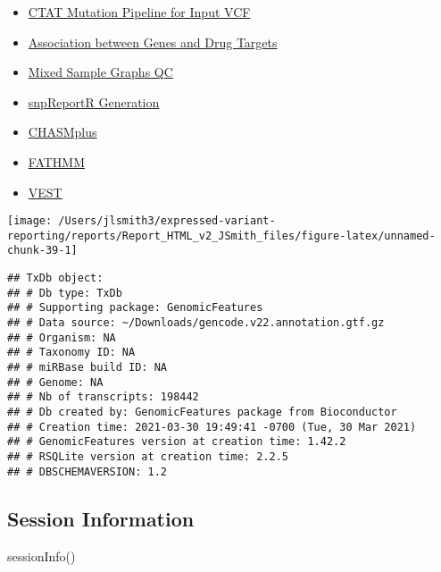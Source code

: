 \documentclass[
]{article}
\newenvironment{Shaded}{\begin{snugshade}}{\end{snugshade}}
\newcommand{\FunctionTok}[1]{\textcolor[rgb]{0.56,0.27,0.68}{#1}}
\newcommand{\NormalTok}[1]{\textcolor[rgb]{0.81,0.81,0.76}{#1}}
\providecommand{\tightlist}{%
  \setlength{\itemsep}{0pt}\setlength{\parskip}{0pt}}
\begin{document}
\begin{itemize}
\tightlist
\item
  \href{https://github.com/collaborativebioinformatics/expressed-variant-impact}{CTAT
  Mutation Pipeline for Input VCF}
\item
  \href{https://github.com/collaborativebioinformatics/viravate2}{Association
  between Genes and Drug Targets}
\item
  \href{https://github.com/collaborativebioinformatics/mixed-sample-graphs}{Mixed
  Sample Graphs QC}
\item
  \href{https://github.com/collaborativebioinformatics/expressed-variant-reporting}{snpReportR
  Generation}
\item
  \href{https://chasmplus.readthedocs.io/en/latest/index.html}{CHASMplus}
\item
  \href{http://fathmm.biocompute.org.uk/}{FATHMM}
\item
  \href{https://karchinlab.org/apps/appVest.html}{VEST}
\end{itemize}

\begin{center}\texttt{[image: /Users/jlsmith3/expressed-variant-reporting/reports/Report\_HTML\_v2\_JSmith\_files/figure-latex/unnamed-chunk-39-1]} \end{center}

\begin{verbatim}
## TxDb object:
## # Db type: TxDb
## # Supporting package: GenomicFeatures
## # Data source: ~/Downloads/gencode.v22.annotation.gtf.gz
## # Organism: NA
## # Taxonomy ID: NA
## # miRBase build ID: NA
## # Genome: NA
## # Nb of transcripts: 198442
## # Db created by: GenomicFeatures package from Bioconductor
## # Creation time: 2021-03-30 19:49:41 -0700 (Tue, 30 Mar 2021)
## # GenomicFeatures version at creation time: 1.42.2
## # RSQLite version at creation time: 2.2.5
## # DBSCHEMAVERSION: 1.2
\end{verbatim}

\hypertarget{session-information}{%
\subsection{Session Information}\label{session-information}}

\begin{Shaded}
\begin{Highlighting}[]
\FunctionTok{sessionInfo}\NormalTok{()}
\end{Highlighting}
\end{Shaded}
\end{document}
